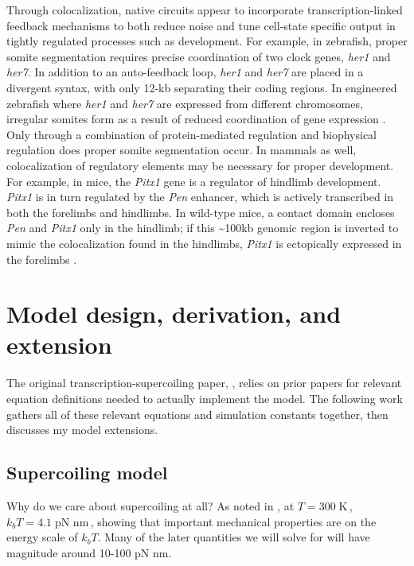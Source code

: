 \documentclass[11pt]{article}
\newcommand{\unit}[1]{\; \text{#1}\,}
\begin{document}
Through colocalization, native circuits appear to incorporate transcription-linked feedback mechanisms to both reduce noise and tune cell-state specific output in tightly regulated processes such as development. For example, in zebrafish, proper somite segmentation requires precise coordination of two clock genes, \textit{her1} and \textit{her7}. In addition to an auto-feedback loop, \textit{her1} and \textit{her7} are placed in a divergent syntax, with only 12-kb separating their coding regions. In engineered zebrafish where \textit{her1} and \textit{her7} are expressed from different chromosomes, irregular somites form as a result of reduced coordination of gene expression \parencite{zinaniPairingSegmentationClock2020}. Only through a combination of protein-mediated regulation and biophysical regulation does proper somite segmentation occur. In mammals as well, colocalization of regulatory elements may be necessary for proper development. For example, in mice, the \textit{Pitx1} gene is a regulator of hindlimb development. \textit{Pitx1} is in turn regulated by the \textit{Pen} enhancer, which is actively transcribed in both the forelimbs and hindlimbs. In wild-type mice, a contact domain encloses \textit{Pen} and \textit{Pitx1} only in the hindlimb; if this  \textasciitilde{}100kb genomic region is inverted to mimic the colocalization found in the hindlimbs, \textit{Pitx1} is ectopically expressed in the forelimbs \parencite{kragesteenDynamic3DChromatin2018}.

\printbibliography

\clearpage
\appendix
\renewcommand{\appendixpagename}{Supplemental information}
\appendixpage
\section{Model design, derivation, and extension}
\label{sec:appendix:model}
The original transcription-supercoiling paper, \cite{sevierPropertiesGeneExpression2018}, relies on prior papers for relevant equation definitions needed to actually implement the model. The following work gathers all of these relevant equations and simulation constants together, then discusses my model extensions.

\subsection{Supercoiling model}
Why do we care about supercoiling at all? As noted in \textcite{markoTorqueDynamicsLinking2007}, at \(T = 300 \unit{K}\), \(k_b T = 4.1 \unit{pN nm}\), showing that
important mechanical properties are on the energy scale of \(k_b T\). Many of the later quantities we will solve for will have magnitude around 10-100 pN nm.
\end{document}
